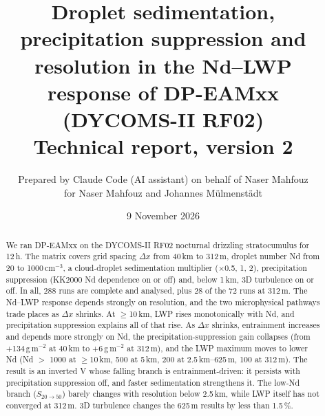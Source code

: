 \documentclass[10pt]{article}
\title{\bfseries Droplet sedimentation, precipitation suppression and resolution in the Nd--LWP response of DP-EAMxx (DYCOMS-II RF02)\\[4pt]\large Technical report, version 2}
\author{Prepared by Claude Code (AI assistant) on behalf of Naser Mahfouz\\ for Naser Mahfouz and Johannes M\"ulmenst\"adt}
\date{9 November 2026}
\begin{document}
\sloppy
\maketitle

\begin{abstract}\noindent
We ran DP-EAMxx on the DYCOMS-II RF02 nocturnal drizzling stratocumulus for 12\,h. The matrix covers grid spacing $\Delta x$ from 40\,km to 312\,m,
droplet number Nd from 20 to 1000\,cm$^{-3}$, a cloud-droplet sedimentation multiplier ($\times$0.5, 1, 2), precipitation suppression
(KK2000 Nd dependence on or off) and, below 1\,km, 3D turbulence on or off. In all, 288 runs are complete and analysed, plus 28 of the 72 runs at 312\,m.
The Nd--LWP response depends strongly on resolution, and the two microphysical pathways trade places as $\Delta x$ shrinks.
At $\geq$10\,km, LWP rises monotonically with Nd, and precipitation suppression explains all of that rise.
As $\Delta x$ shrinks, entrainment increases and depends more strongly on Nd, the precipitation-suppression gain collapses
(from +134\,g\,m$^{-2}$ at 40\,km to +6\,g\,m$^{-2}$ at 312\,m), and the LWP maximum moves to lower Nd
(Nd $>$ 1000 at $\geq$10\,km, 500 at 5\,km, 200 at 2.5\,km--625\,m, 100 at 312\,m). The result is an inverted V whose falling branch is
entrainment-driven: it persists with precipitation suppression off, and faster sedimentation strengthens it. The low-Nd branch ($S_{20\to50}$) barely changes with
resolution below 2.5\,km, while LWP itself has not converged at 312\,m. 3D turbulence changes the 625\,m results by less than 1.5\,\%.
\end{abstract}
\end{document}
